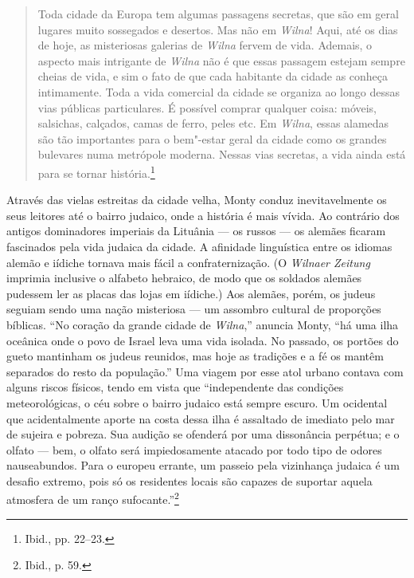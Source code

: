 %

\begin{quote}
Toda cidade da Europa tem algumas passagens secretas, que são em geral
lugares muito sossegados e desertos. Mas não em \textit{Wilna}! Aqui, até os dias
de hoje, as misteriosas galerias de \textit{Wilna} fervem de vida. Ademais, o
aspecto mais intrigante de \textit{Wilna} não é que essas passagem estejam sempre
cheias de vida, e sim o fato de que cada habitante da cidade as conheça
intimamente. Toda a vida comercial da cidade se organiza ao longo dessas
vias públicas particulares. É possível comprar qualquer coisa: móveis,
salsichas, calçados, camas de ferro, peles etc. Em \textit{Wilna}, essas alamedas
são tão importantes para o bem"-estar geral da cidade como os grandes
bulevares numa metrópole moderna. Nessas vias secretas, a vida ainda
está para se tornar história.\footnote{Ibid., pp. 22--23.}
\end{quote}

Através das vielas estreitas da cidade velha, Monty conduz
inevitavelmente os seus leitores até o bairro judaico, onde a história é
mais vívida. Ao contrário dos antigos dominadores imperiais da Lituânia
--- os russos --- os alemães ficaram fascinados pela vida judaica da cidade.
A afinidade linguística entre os idiomas alemão e iídiche tornava mais
fácil a confraternização. (O \textit{Wilnaer Zeitung} imprimia inclusive o
alfabeto hebraico, de modo que os soldados alemães pudessem ler as
placas das lojas em iídiche.) Aos alemães, porém, os judeus seguiam
sendo uma nação misteriosa --- um assombro cultural de proporções
bíblicas. ``No coração da grande cidade de \textit{Wilna},'' anuncia Monty, ``há
uma ilha oceânica onde o povo de Israel leva uma vida isolada. No
passado, os portões do gueto mantinham os judeus reunidos, mas hoje as
tradições e a fé os mantêm separados do resto da população.'' Uma viagem
por esse atol urbano contava com alguns riscos físicos, tendo em vista
que ``independente das condições meteorológicas, o céu sobre o bairro
judaico está sempre escuro. Um ocidental que acidentalmente aporte na
costa dessa ilha é assaltado de imediato pelo mar de sujeira e pobreza.
Sua audição se ofenderá por uma dissonância perpétua; e o olfato --- bem,
o olfato será impiedosamente atacado por todo tipo de odores
nauseabundos. Para o europeu errante, um passeio pela vizinhança judaica
é um desafio extremo, pois só os residentes locais são capazes de
suportar aquela atmosfera de um ranço sufocante.''\footnote{Ibid., p. 59.}

